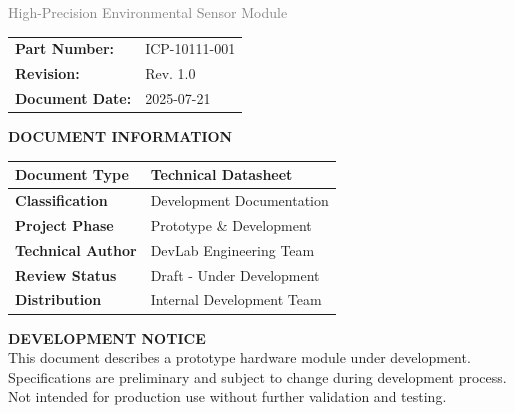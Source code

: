 \documentclass[11pt,a4paper]{article}
\begin{document}
\begin{titlepage}
    {\LARGE \textcolor{gray}{High-Precision Environmental Sensor Module}}\\[0.5cm]
    
    
    \begin{tcolorbox}[
        colback=gray!10!white,
        colframe=gray!50!black,
        width=0.7\textwidth,
        arc=1mm,
        boxrule=1pt
    ]
    \centering
    \begin{tabular}{l l}
    \textbf{Part Number:} & ICP-10111-001 \\
    \textbf{Revision:} & Rev. 1.0 \\
    \textbf{Document Date:} & 2025-07-21
    \end{tabular}
    \end{tcolorbox}
    
    \vspace{1cm}
    
    \begin{tcolorbox}[
        colback=white,
        colframe=black,
        width=0.9\textwidth,
        arc=0mm,
        boxrule=1pt,
        halign=center
    ]
    {\normalsize \textbf{DOCUMENT INFORMATION}}\\[0.3cm]
    \begin{tabular}{|l|l|}
    \hline
    \textbf{Document Type} & Technical Datasheet \\
    \hline
    \textbf{Classification} & Development Documentation \\
    \hline
    \textbf{Project Phase} & Prototype \& Development \\
    \hline
    
    \textbf{Technical Author} & DevLab Engineering Team \\
    \hline
    
    \textbf{Review Status} & Draft - Under Development \\
    \hline
    \textbf{Distribution} & Internal Development Team \\
    \hline
    \end{tabular}
    \end{tcolorbox}
    
    \vspace{0.8cm}
    
    \begin{tcolorbox}[
        colback=yellow!5!white,
        colframe=orange!75!black,
        width=\textwidth,
        arc=1mm,
        boxrule=1pt
    ]
    \centering
    {\small \textbf{DEVELOPMENT NOTICE}}\\[0.2cm]
    {\footnotesize This document describes a prototype hardware module under development.}\\
    {\footnotesize Specifications are preliminary and subject to change during development process.}\\
    {\footnotesize Not intended for production use without further validation and testing.}
    \end{tcolorbox}
    

\end{titlepage}
\end{document}
